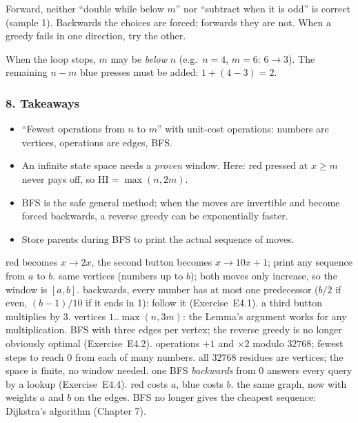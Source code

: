 \begin{warningbox}
Forward, neither ``double while below $m$'' nor ``subtract when it is odd'' is correct (sample 1). Backwards the choices are forced; forwards they are not. When a greedy fails in one direction, try the other.
\end{warningbox}

\begin{warningbox}
When the loop stops, $m$ may be \emph{below} $n$ (e.g.\ $n = 4$, $m = 6$: $6 \to 3$). The remaining $n - m$ blue presses must be added: $1 + (4 - 3) = 2$.
\end{warningbox}

\subsubsection*{8. Takeaways}

\begin{itemize}[leftmargin=*]
    \item ``Fewest operations from $n$ to $m$'' with unit-cost operations: numbers are vertices, operations are edges, BFS.
    \item An infinite state space needs a \emph{proven} window. Here: red pressed at $x \ge m$ never pays off, so $\text{HI} = \max(n, 2m)$.
    \item BFS is the safe general method; when the moves are invertible and become forced backwards, a reverse greedy can be exponentially faster.
    \item Store parents during BFS to print the actual sequence of moves.
\end{itemize}

\begin{variantsbox}
  {red becomes $x \to 2x$, the second button becomes $x \to 10x + 1$; print any sequence from $a$ to $b$.}
  {same vertices (numbers up to $b$); both moves only increase, so the window is $[a, b]$.}
  {backwards, every number has at most one predecessor ($b/2$ if even, $(b-1)/10$ if it ends in 1): follow it (Exercise~E4.1).}
  {a third button multiplies by 3.}
  {vertices $1..\max(n, 3m)$: the Lemma's argument works for any multiplication.}
  {BFS with three edges per vertex; the reverse greedy is no longer obviously optimal (Exercise~E4.2).}
  {operations $+1$ and $\times2$ modulo $32768$; fewest steps to reach 0 from each of many numbers.}
  {all $32768$ residues are vertices; the space is finite, no window needed.}
  {one BFS \emph{backwards} from 0 answers every query by a lookup (Exercise~E4.4).}
  {red costs $a$, blue costs $b$.}
  {the same graph, now with weights $a$ and $b$ on the edges.}
  {BFS no longer gives the cheapest sequence: Dijkstra's algorithm (Chapter 7).}
\end{variantsbox}
